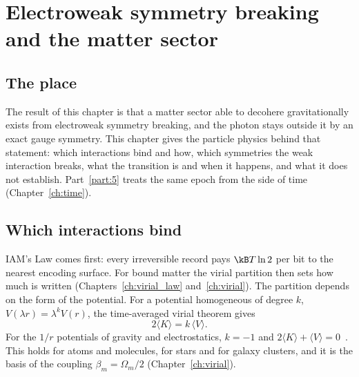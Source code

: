 \chapter{Electroweak symmetry breaking and the matter sector}\label{ch:electroweak}

\section*{The place}
The result of this chapter is that a matter sector able to decohere gravitationally exists from electroweak symmetry breaking, and the
photon stays outside it by an exact gauge symmetry. This chapter gives the particle physics behind that statement: which interactions bind and how,
which symmetries the weak interaction breaks, what the transition is and when it happens, and what it does not establish. Part~\ref{part:5} treats the same
epoch from the side of time (Chapter~\ref{ch:time}).

\section{Which interactions bind}\label{sec:ew:bind}
IAM's Law comes first: every irreversible record pays $\kB T\ln2$ per bit to the nearest encoding surface. For bound matter the virial partition then
sets how much is written (Chapters~\ref{ch:virial_law} and~\ref{ch:virial}). The partition depends on the form of the potential. For a potential
homogeneous of degree $k$, $V(\lambda r)=\lambda^kV(r)$, the time-averaged virial theorem gives~\cite{Clausius1870}
\begin{equation}
2\langle K\rangle=k\,\langle V\rangle.\label{eq:ew:virial}
\end{equation}
\derived{} For the $1/r$ potentials of gravity and electrostatics, $k=-1$ and $2\langle K\rangle+\langle V\rangle=0$~\cite{Clausius1870}. This holds for atoms and
molecules, for stars and for galaxy clusters, and it is the basis of the coupling $\beta_m=\Omega_m/2$ (Chapter~\ref{ch:virial}).

